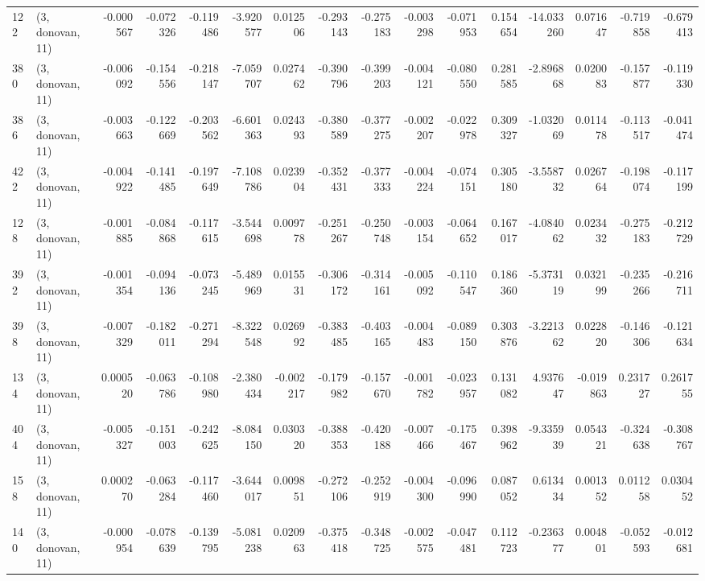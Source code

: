 \begin{tabular}{llrrrrrrrrrrrrrr}
122 &  (3, donovan, 11) &  -0.000567 & -0.072326 & -0.119486 &  -3.920577 &  0.012506 &  -0.293143 & -0.275183 & -0.003298 & -0.071953 &  0.154654 &   -14.033260 &   0.071647 &  -0.719858 &  -0.679413 \\
380 &  (3, donovan, 11) &  -0.006092 & -0.154556 & -0.218147 &  -7.059707 &  0.027462 &  -0.390796 & -0.399203 & -0.004121 & -0.080550 &  0.281585 &    -2.896868 &   0.020083 &  -0.157877 &  -0.119330 \\
386 &  (3, donovan, 11) &  -0.003663 & -0.122669 & -0.203562 &  -6.601363 &  0.024393 &  -0.380589 & -0.377275 & -0.002207 & -0.022978 &  0.309327 &    -1.032069 &   0.011478 &  -0.113517 &  -0.041474 \\
422 &  (3, donovan, 11) &  -0.004922 & -0.141485 & -0.197649 &  -7.108786 &  0.023904 &  -0.352431 & -0.377333 & -0.004224 & -0.074151 &  0.305180 &    -3.558732 &   0.026764 &  -0.198074 &  -0.117199 \\
128 &  (3, donovan, 11) &  -0.001885 & -0.084868 & -0.117615 &  -3.544698 &  0.009778 &  -0.251267 & -0.250748 & -0.003154 & -0.064652 &  0.167017 &    -4.084062 &   0.023432 &  -0.275183 &  -0.212729 \\
392 &  (3, donovan, 11) &  -0.001354 & -0.094136 & -0.073245 &  -5.489969 &  0.015531 &  -0.306172 & -0.314161 & -0.005092 & -0.110547 &  0.186360 &    -5.373119 &   0.032199 &  -0.235266 &  -0.216711 \\
398 &  (3, donovan, 11) &  -0.007329 & -0.182011 & -0.271294 &  -8.322548 &  0.026992 &  -0.383485 & -0.403165 & -0.004483 & -0.089150 &  0.303876 &    -3.221362 &   0.022820 &  -0.146306 &  -0.121634 \\
134 &  (3, donovan, 11) &   0.000520 & -0.063786 & -0.108980 &  -2.380434 & -0.002217 &  -0.179982 & -0.157670 & -0.001782 & -0.023957 &  0.131082 &     4.937647 &  -0.019863 &   0.231727 &   0.261755 \\
404 &  (3, donovan, 11) &  -0.005327 & -0.151003 & -0.242625 &  -8.084150 &  0.030320 &  -0.388353 & -0.420188 & -0.007466 & -0.175467 &  0.398962 &    -9.335939 &   0.054321 &  -0.324638 &  -0.308767 \\
158 &  (3, donovan, 11) &   0.000270 & -0.063284 & -0.117460 &  -3.644017 &  0.009851 &  -0.272106 & -0.252919 & -0.004300 & -0.096990 &  0.087052 &     0.613434 &   0.001352 &   0.011258 &   0.030452 \\
140 &  (3, donovan, 11) &  -0.000954 & -0.078639 & -0.139795 &  -5.081238 &  0.020963 &  -0.375418 & -0.348725 & -0.002575 & -0.047481 &  0.112723 &    -0.236377 &   0.004801 &  -0.052593 &  -0.012681 \\

\end{tabular}
